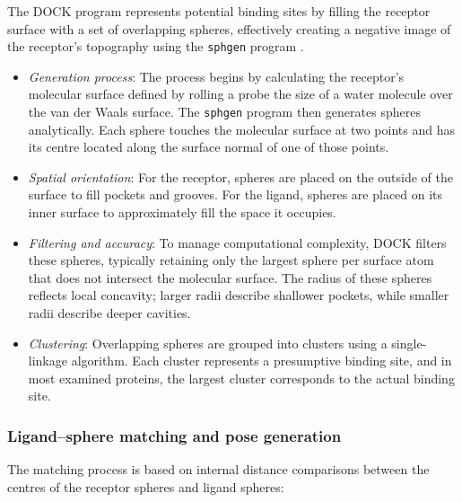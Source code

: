 \documentclass[12pt]{article}
\begin{document}
The DOCK program represents potential binding sites by filling the receptor surface with a set of overlapping spheres, effectively creating a negative image of the receptor’s topography using the \verb|sphgen| program \cite{CH7_Kuntz1982}. 
\begin{itemize}

\item \emph{Generation process}: The process begins by calculating the receptor's molecular surface defined by rolling a probe the size of a water molecule over the van der Waals surface. The \verb|sphgen| program then generates spheres analytically. Each sphere touches the molecular surface at two points and has its centre located along the surface normal of one of those points.
\item \emph{Spatial orientation}: For the receptor, spheres are placed on the outside of the surface to fill pockets and grooves. For the ligand, spheres are placed on its inner surface to approximately fill the space it occupies.
\item \emph{Filtering and accuracy}: To manage computational complexity, DOCK filters these spheres, typically retaining only the largest sphere per surface atom that does not intersect the molecular surface. The radius of these spheres reflects local concavity; larger radii describe shallower pockets, while smaller radii describe deeper cavities.
\item \emph{Clustering}: Overlapping spheres are grouped into clusters using a single-linkage algorithm. Each cluster represents a presumptive binding site, and in most examined proteins, the largest cluster corresponds to the actual binding site. 

\end{itemize}

\subsubsection{Ligand–sphere matching and pose generation}

The matching process is based on internal distance comparisons between the centres of the receptor spheres and ligand spheres\cite{CH7_Kuntz1982,CH7_Shoichet1992Shape}:
\end{document}
